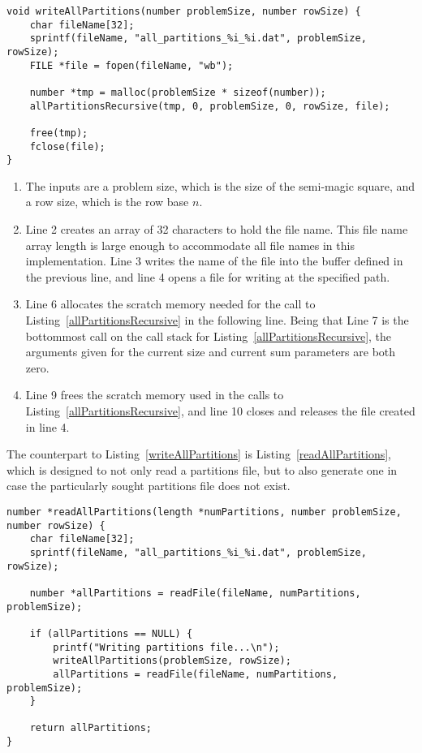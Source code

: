 \begin{lstlisting}[caption={Writing all partitions to a file.},label={writeAllPartitions}]
void writeAllPartitions(number problemSize, number rowSize) {
    char fileName[32];
    sprintf(fileName, "all_partitions_%i_%i.dat", problemSize, rowSize);
    FILE *file = fopen(fileName, "wb");

    number *tmp = malloc(problemSize * sizeof(number));
    allPartitionsRecursive(tmp, 0, problemSize, 0, rowSize, file);

    free(tmp);
    fclose(file);
}
\end{lstlisting}

\begin{enumerate}
\item The inputs are a problem size, which is the size of the semi-magic square, and a row size, which is the row base $n$.
\item Line 2 creates an array of 32 characters to hold the file name. This file name array length is large enough to accommodate all file names in this implementation. Line 3 writes the name of the file into the buffer defined in the previous line, and line 4 opens a file for writing at the specified path.
\addtocounter{enumi}{3}
\item Line 6 allocates the scratch memory needed for the call to Listing~\ref{allPartitionsRecursive} in the following line. Being that Line 7 is the bottommost call on the call stack for Listing~\ref{allPartitionsRecursive}, the arguments given for the current size and current sum parameters are both zero.
\addtocounter{enumi}{2}
\item Line 9 frees the scratch memory used in the calls to Listing~\ref{allPartitionsRecursive}, and line 10 closes and releases the file created in line 4.
\end{enumerate}

The counterpart to Listing~\ref{writeAllPartitions} is Listing~\ref{readAllPartitions}, which is designed to not only read a partitions file, but to also generate one in case the particularly sought partitions file does not exist.

\begin{lstlisting}[caption={Reading all partitions from a file.},label={readAllPartitions}]
number *readAllPartitions(length *numPartitions, number problemSize, number rowSize) {
    char fileName[32];
    sprintf(fileName, "all_partitions_%i_%i.dat", problemSize, rowSize);

    number *allPartitions = readFile(fileName, numPartitions, problemSize);

    if (allPartitions == NULL) {
        printf("Writing partitions file...\n");
        writeAllPartitions(problemSize, rowSize);
        allPartitions = readFile(fileName, numPartitions, problemSize);
    }

    return allPartitions;
}
\end{lstlisting}

